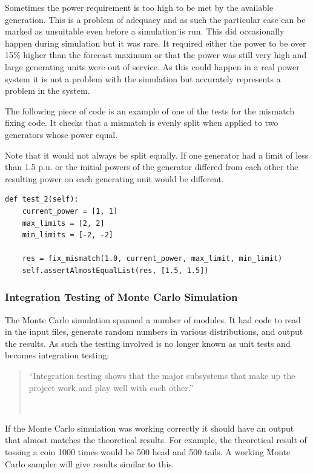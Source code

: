 \documentclass[a4paper,oneside,12pt]{report}
\newcommand{\tmpquotecite}{}%
\newenvironment{myquote}[1][]
{\renewcommand{\tmpquotecite}{#1}\begin{quote}\begin{itshape}``}
{''\end{itshape}~{\normalfont~\tmpquotecite}\end{quote}}
\begin{document}
Sometimes the power requirement is too high to be met by the available
generation. This is a problem of adequacy and as such the particular
case can be marked as unsuitable even before a simulation is run. This
did occasionally happen during simulation but it was rare. It required
either the power to be over 15\% higher than the forecast maximum or
that the power was still very high and large generating units were out
of service. As this could happen in a real power system it is not a
problem with the simulation but accurately represents a problem in the
system.

The following piece of code is an example of one of the tests for the mismatch fixing code. It
checks that a mismatch is evenly split when applied to two generators whose power equal.

Note that it would not always be split equally. If one generator had a
limit of less than 1.5 p.u. or the initial powers of the generator differed
from each other the resulting power on each generating unit would be
different.

\begin{verbatim}
def test_2(self):
    current_power = [1, 1]
    max_limits = [2, 2]
    min_limits = [-2, -2]

    res = fix_mismatch(1.0, current_power, max_limit, min_limit)
    self.assertAlmostEqualList(res, [1.5, 1.5])
\end{verbatim}

\subsubsection{Integration Testing of Monte Carlo Simulation}

The Monte Carlo simulation spanned a number of modules. It had code to
read in the input files, generate random numbers in various
distributions, and output the results. As such the testing involved is
no longer known as unit tests and becomes integration testing:

\begin{myquote}[\cite{Hunt2000}]Integration testing shows that the major subsystems that make up the project work and play well with each other.\end{myquote}

If the Monte Carlo simulation was working correctly it should have an
output that almost matches the theoretical results. For example, the
theoretical result of tossing a coin 1000 times would be 500 head and
500 tails. A working Monte Carlo sampler will give results
similar to this.
\end{document}
